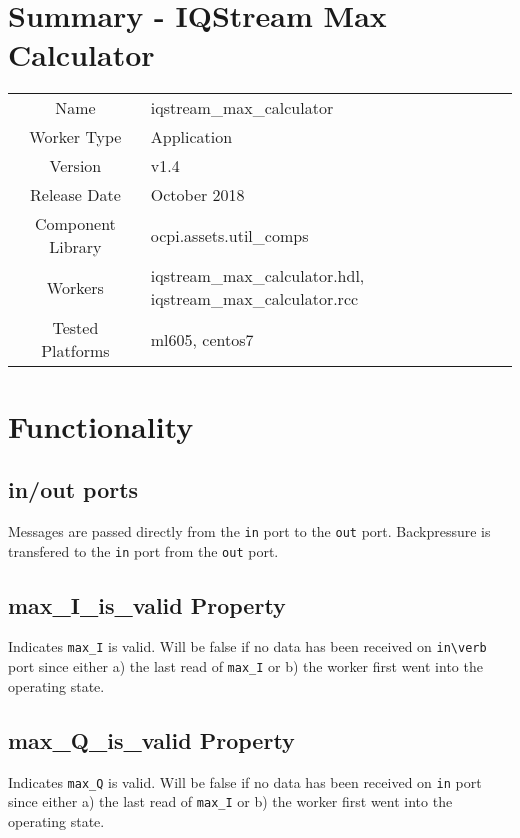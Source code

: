 \documentclass{article}
\author{} %
\date{Version \docVersion} %
\title{\docTitle}
\def\docVersion{1.4}
\def\comp{temp}
\def\comp{iqstream\_max\_calculator}
\def\Comp{TEMP}
\def\Comp{Iqstream\ Max\ Calculator }
\def\comp{iqstream\_max\_calculator}
\def\Comp{IQStream Max Calculator}
\begin{document}
\section*{Summary - \Comp}
\begin{tabular}{|c|M{13.5cm}|}
	\hline
	                  &                                                                                \\
	\hline
	Name              & \comp                                                                          \\
	\hline
	Worker Type       & Application                                                                    \\
	\hline
	Version           &  v\docVersion \\
	\hline
	Release Date      &  October 2018 \\
	\hline
	Component Library &  ocpi.assets.util\_comps \\
	\hline
	Workers           &  \comp.hdl, \comp.rcc \\
	\hline
	Tested Platforms  &  ml605, centos7 \\
	\hline
\end{tabular}

\section*{Functionality}
\subsection*{in/out ports}
Messages are passed directly from the \verb+in+ port to the \verb+out+ port. Backpressure is transfered to the \verb+in+ port from the \verb+out+ port.
\subsection*{max\_I\_is\_valid Property}
Indicates \verb+max_I+ is valid. Will be false if no data has
                       been received on \verb+in\verb+ port since either a) the last read of
                       \verb+max_I+ or b) the worker first went into the operating
                       state.
\subsection*{max\_Q\_is\_valid Property}
Indicates \verb+max_Q+ is valid. Will be false if no data has
                       been received on \verb+in+ port since either a) the last read of
                       \verb+max_I+ or b) the worker first went into the operating
                       state.
\end{document}
